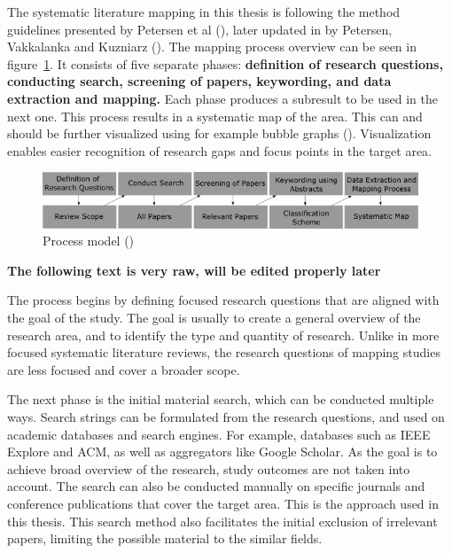 \documentclass[utf8,english]{gradu3}
\begin{document}
The systematic literature mapping in this thesis is following the method
guidelines presented by Petersen et al (\cite*{petersen2008}), later updated in
by Petersen, Vakkalanka and Kuzniarz (\cite*{petersen2015}). The mapping process
overview can be seen in figure~\ref{fig:mapping}. It consists of five separate
phases: \textbf{definition of research questions, conducting search, screening of
papers, keywording, and data extraction and mapping.} Each phase produces a
subresult to be used in the next one. This process results in a systematic map
of the area. This can and should be further visualized using for example bubble
graphs (\cite{petersen2008}). Visualization enables easier recognition of 
research gaps and focus points in the target area.


\begin{figure}[h]
  \includegraphics[width=\linewidth]{images/method_graph_L.png}
  \caption{Process model (\cite{petersen2008})}
  \label{fig:mapping}
\end{figure}

\textbf{The following text is very raw, will be edited properly later}

The process begins by defining focused research questions that are aligned
with the goal of the study. The goal is usually to create a general overview
of the research area, and to identify the type and quantity of research.
Unlike in more focused systematic literature reviews, the research questions
of mapping studies are less focused and cover a broader scope.

The next phase is the initial material search, which can be conducted multiple
ways. Search strings can be formulated from the research questions, and used on
academic databases and search engines. For example, databases such as IEEE
Explore and ACM, as well as aggregators like Google Scholar. As the goal is to
achieve broad overview of the research, study outcomes are not taken into
account.
The search can also be conducted manually on specific journals and
conference publications that cover the target area. This is the approach used in
this thesis. This search method also facilitates the initial exclusion of
irrelevant papers, limiting the possible material to the similar fields.
\end{document}
